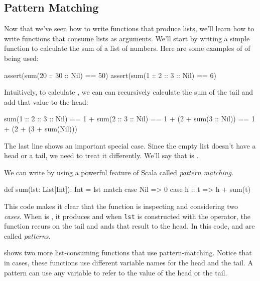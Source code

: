 \documentclass{book}
\begin{document}
\subsection{Pattern Matching}

Now that we've seen how to write functions that produce lists, we'll
learn how to write functions that consume lists as arguments. We'll
start by writing a simple function to calculate the sum of a list of numbers.
Here are some examples of of  being used:
%
\begin{scalacode}
assert(sum(20 :: 30 :: Nil) == 50)
assert(sum(1 :: 2 :: 3 :: Nil) == 6)
\end{scalacode}

Intuitively, to calculate , we can
can recursively calculate the sum of the tail and add that value to the
head:
\begin{scalacode}
   sum(1 :: 2 :: 3 :: Nil)
== 1 + sum(2 :: 3 :: Nil)
== 1 + (2 + sum(3 :: Nil))
== 1 + (2 + (3 + sum(Nil)))
\end{scalacode}
%
The last line shows an important special case. Since the empty list
doesn't have a head or a tail, we need to treat it differently. We'll say
that  is .

We can write  by using a powerful feature of
Scala called \emph{pattern matching}.
%
\begin{scalacode}
def sum(lst: List[Int]): Int = {
  lst match {
    case Nil => 0
    case h :: t => h + sum(t)
  }
}
\end{scalacode}
%
This code makes it clear that the function is inspecting 
and considering two \emph{cases}. When  is ,
it produces  and when \lstinline{lst} is constructed with
the \scalainline{::} operator, the function recurs on the tail and ands
that result to the head. In this code,
 and  are called \emph{patterns}.

 shows two more list-consuming functions that
use pattern-matching. Notice that in \scalainline{::} cases, these functions
use different variable names for the head and the tail. A pattern can use
any variable to refer to the value of the head or the tail.
\end{document}
